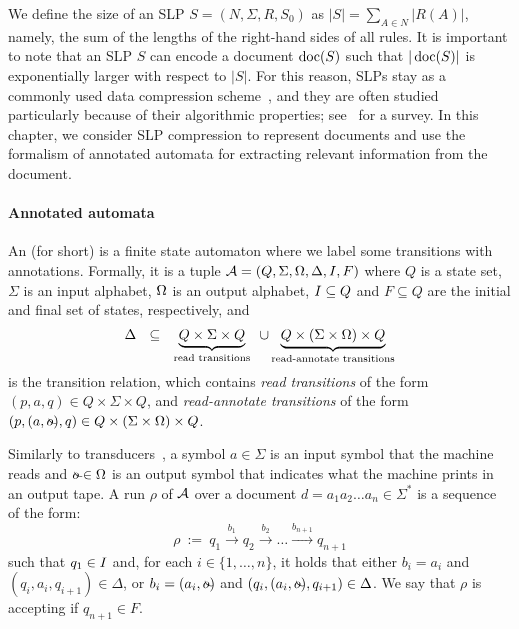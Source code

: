 We define the size of an SLP $S = (N,\Sigma,R,S_0)$ as $|S|= \sum_{A \in N} |R(A)|$, namely, the sum of the lengths of the right-hand sides of all rules.
It is important to note that an SLP $S$ can encode a document $\operatorname{doc}(S)$ such that $|\operatorname{doc}(S)|$ is exponentially larger with respect to $|S|$. For this reason, SLPs stay as a commonly used data compression scheme~\cite{StorerS82, KiefferY00, Rytter02, ClaudeN11}, and they are often studied particularly because of their algorithmic properties; see~\cite{Lohrey12} for a survey. In this chapter, we consider SLP compression to represent documents and use the formalism of annotated automata for extracting relevant information from the document.

\paragraph{Annotated automata} 
An \emph{\rtname} (\rt for short) is a finite state automaton where we label some transitions with annotations. Formally, it is a tuple $\mathcal{A} = (Q, \Sigma, \Omega, \Delta, I, F)$ where $Q$ is a state set, $\Sigma$ is an input alphabet, $\Omega$ is an output alphabet, $I \subseteq Q$ and $F \subseteq Q$ are the initial and final set of states, respectively, and
$$
\Delta \ \ \subseteq \ \ \underbrace{Q \times \Sigma \times Q}_{\text{read transitions}} \ \, \cup \underbrace{Q \times (\Sigma \times \Omega) \times Q}_{\text{read-annotate transitions}}
$$ 
is the transition relation, which contains {\em read transitions} of the form  $(p, a, q)\in Q\times\Sigma\times Q$, and {\em read-annotate transitions} of the form $(p, (a, \oout), q)\in Q\times(\Sigma\times\oalph)\times Q$.

Similarly to transducers~\cite{berstel2013transductions}, a symbol $a \in \Sigma$ is an input symbol that the machine reads and $\oout \in \oalph$ is an output symbol that indicates what the machine prints in an output tape.
A run $\rho$ of $\mathcal{A}$ over a document $d = a_1a_2\ldots a_n \in\Sigma^*$ is a sequence of the form:
$$
\rho \ := \ q_1 \xrightarrow{b_1} q_2 \xrightarrow{b_2} \ldots \xrightarrow{b_{n+1}} q_{n+1}
$$
such that $q_1\in I$ and, for each $i\in \{1,\ldots, n\}$, it holds that either $b_i = a_i$ and $(q_i,a_i,q_{i+1})\in\Delta$, or $b_i = (a_i,\oout)$ and $(q_{i},(a_i,\oout),q_{i+1})\in\Delta$. 
We say that $\rho$ is accepting if $q_{n+1}\in F$.

